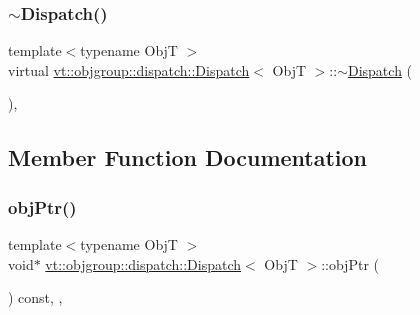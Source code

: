 \mbox{\label{structvt_1_1objgroup_1_1dispatch_1_1_dispatch_af0c5622152b327cd5a5fb781b6062e42}} 
\subsubsection{\texorpdfstring{$\sim$\+Dispatch()}{~Dispatch()}}
{\footnotesize\ttfamily template$<$typename ObjT $>$ \\
virtual \hyperlink{structvt_1_1objgroup_1_1dispatch_1_1_dispatch}{vt\+::objgroup\+::dispatch\+::\+Dispatch}$<$ ObjT $>$\+::$\sim$\hyperlink{structvt_1_1objgroup_1_1dispatch_1_1_dispatch}{Dispatch} (\begin{DoxyParamCaption}{ }\end{DoxyParamCaption})\hspace{0.3cm}{\ttfamily [virtual]}, {\ttfamily [default]}}



\subsection{Member Function Documentation}
\mbox{\label{structvt_1_1objgroup_1_1dispatch_1_1_dispatch_aea2f9957c5f4b07413a205d34bcfbd5c}} 
\subsubsection{\texorpdfstring{obj\+Ptr()}{objPtr()}}
{\footnotesize\ttfamily template$<$typename ObjT $>$ \\
void$\ast$ \hyperlink{structvt_1_1objgroup_1_1dispatch_1_1_dispatch}{vt\+::objgroup\+::dispatch\+::\+Dispatch}$<$ ObjT $>$\+::obj\+Ptr (\begin{DoxyParamCaption}{ }\end{DoxyParamCaption}) const\hspace{0.3cm}{\ttfamily [inline]}, {\ttfamily [override]}, {\ttfamily [virtual]}}



